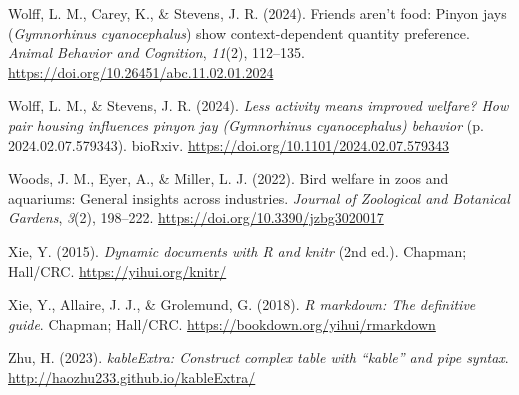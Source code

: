 \documentclass[
  pub]{apa6}
\newlength{\cslhangindent}
\newenvironment{CSLReferences}[2] %
 {\begin{list}{}{%
  \setlength{\itemindent}{0pt}
  \setlength{\leftmargin}{0pt}
  \setlength{\parsep}{0pt}
  \ifodd #1
   \setlength{\leftmargin}{\cslhangindent}
   \setlength{\itemindent}{-1\cslhangindent}
  \fi
  \setlength{\itemsep}{#2\baselineskip}}}
 {\end{list}}
\begin{document}
\begin{CSLReferences}{1}{0}
Wolff, L. M., Carey, K., \& Stevens, J. R. (2024). Friends aren't food: {Pinyon} jays ({\emph{Gymnorhinus}}{ \emph{cyanocephalus}}) show context-dependent quantity preference. \emph{Animal Behavior and Cognition}, \emph{11}(2), 112--135. \url{https://doi.org/10.26451/abc.11.02.01.2024}

Wolff, L. M., \& Stevens, J. R. (2024). \emph{Less activity means improved welfare? {How} pair housing influences pinyon jay ({\emph{Gymnorhinus}}{ \emph{cyanocephalus}}) behavior} (p. 2024.02.07.579343). bioRxiv. \url{https://doi.org/10.1101/2024.02.07.579343}

Woods, J. M., Eyer, A., \& Miller, L. J. (2022). Bird welfare in zoos and aquariums: {General} insights across industries. \emph{Journal of Zoological and Botanical Gardens}, \emph{3}(2), 198--222. \url{https://doi.org/10.3390/jzbg3020017}

Xie, Y. (2015). \emph{Dynamic documents with {R} and knitr} (2nd ed.). Chapman; Hall/CRC. \url{https://yihui.org/knitr/}

Xie, Y., Allaire, J. J., \& Grolemund, G. (2018). \emph{R markdown: The definitive guide}. Chapman; Hall/CRC. \url{https://bookdown.org/yihui/rmarkdown}

Zhu, H. (2023). \emph{{kableExtra}: Construct complex table with {``kable''} and pipe syntax}. \url{http://haozhu233.github.io/kableExtra/}

\end{CSLReferences}
\end{document}
